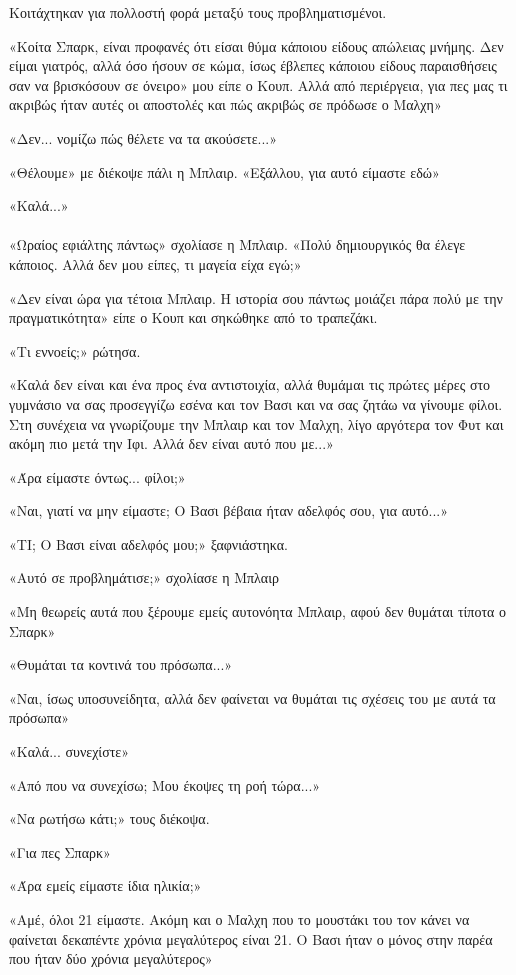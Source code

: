\documentclass[12pt,twoside, openany]{book}
\begin{document}
Κοιτάχτηκαν για πολλοστή φορά μεταξύ τους προβληματισμένοι.

«Κοίτα Σπαρκ, είναι προφανές ότι είσαι θύμα κάποιου είδους απώλειας μνήμης. Δεν είμαι γιατρός, αλλά όσο ήσουν σε κώμα, ίσως έβλεπες κάποιου είδους παραισθήσεις σαν να βρισκόσουν σε όνειρο» μου είπε ο Κουπ. Αλλά από περιέργεια, για πες μας τι ακριβώς ήταν αυτές οι αποστολές και πώς ακριβώς σε πρόδωσε ο Μαλχη»

«Δεν... νομίζω πώς θέλετε να τα ακούσετε...»

«Θέλουμε» με διέκοψε πάλι η Μπλαιρ. «Εξάλλου, για αυτό είμαστε εδώ»

«Καλά...»\\\\

«Ωραίος εφιάλτης πάντως» σχολίασε η Μπλαιρ. «Πολύ δημιουργικός θα έλεγε κάποιος. Αλλά δεν μου είπες, τι μαγεία είχα εγώ;»

«Δεν είναι ώρα για τέτοια Μπλαιρ. Η ιστορία σου πάντως μοιάζει πάρα πολύ με την πραγματικότητα» είπε ο Κουπ και σηκώθηκε από το τραπεζάκι.

«Τι εννοείς;» ρώτησα.

«Καλά δεν είναι και ένα προς ένα αντιστοιχία, αλλά θυμάμαι τις πρώτες μέρες στο γυμνάσιο να σας προσεγγίζω εσένα και τον Βασι και να σας ζητάω να γίνουμε φίλοι. Στη συνέχεια να γνωρίζουμε την Μπλαιρ και τον Μαλχη, λίγο αργότερα τον Φυτ και ακόμη πιο μετά την Ιφι. Αλλά δεν είναι αυτό που με...»

«Άρα είμαστε όντως... φίλοι;»

«Ναι, γιατί να μην είμαστε; Ο Βασι βέβαια ήταν αδελφός σου, για αυτό...»

«ΤΙ; Ο Βασι είναι αδελφός μου;» ξαφνιάστηκα.

«Αυτό σε προβλημάτισε;» σχολίασε η Μπλαιρ

«Μη θεωρείς αυτά που ξέρουμε εμείς αυτονόητα Μπλαιρ, αφού δεν θυμάται τίποτα ο Σπαρκ»

«Θυμάται τα κοντινά του πρόσωπα...»

«Ναι, ίσως υποσυνείδητα, αλλά δεν φαίνεται να θυμάται τις σχέσεις του με αυτά τα πρόσωπα»

«Καλά... συνεχίστε»

«Από που να συνεχίσω; Μου έκοψες τη ροή τώρα...»

«Να ρωτήσω κάτι;» τους διέκοψα.

«Για πες Σπαρκ»

«Άρα εμείς είμαστε ίδια ηλικία;»

«Αμέ, όλοι 21 είμαστε. Ακόμη και ο Μαλχη που το μουστάκι του τον κάνει να φαίνεται δεκαπέντε χρόνια μεγαλύτερος είναι 21. Ο Βασι ήταν ο μόνος στην παρέα που ήταν δύο χρόνια μεγαλύτερος»
\end{document}
